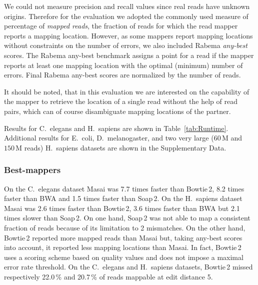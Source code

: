 We could not measure precision and recall values since real reads have unknown origins. Therefore for the evaluation we adopted the commonly used measure of percentage of \emph{mapped reads}, \ie the fraction of reads for which the read mapper reports a mapping location.
However, as some mappers report mapping locations without constraints on the number of errors, we also included Rabema \emph{any-best} scores.
The Rabema any-best benchmark assigns a point for a read if the mapper reports at least one mapping location with the optimal (minimum) number of errors.
Final Rabema any-best scores are normalized by the number of reads.

It should be noted, that in this evaluation we are interested on the capability of the mapper to retrieve the location of a single read without the help of read pairs, which can of course disambiguate mapping locations of the partner.

Results for C.~elegans and H.~sapiens are shown in Table~\ref{tab:Runtime}.
Additional results for E.~coli, D.~melanogaster, and two very large ($60\,\text{M}$ and $150\,\text{M}$ reads)  H.~sapiens datasets are shown in the Supplementary Data.

\subsubsection{Best-mappers}
On the C.~elegans dataset Masai was 7.7 times faster than Bowtie\,2, 8.2 times faster than BWA and 1.5 times faster than Soap\,2.
On the H.~sapiens dataset Masai was 2.6 times faster than Bowtie\,2, 3.6 times faster than BWA but 2.1 times slower than Soap\,2.
On one hand, Soap\,2 was not able to map a consistent fraction of reads because of its limitation to 2 mismatches.
On the other hand, Bowtie\,2 reported more mapped reads than Masai but, taking any-best scores into account, it reported less mapping locations than Masai.
In fact, Bowtie\,2 uses a scoring scheme based on quality values and does not impose a maximal error rate threshold.
On the C.~elegans and H.~sapiens datasets, Bowtie\,2 missed respectively 22.0\,\% and 20.7\,\% of reads mappable at edit distance 5.


